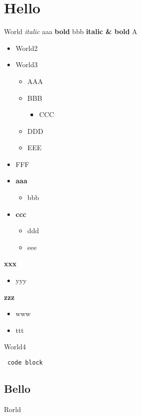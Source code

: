 ﻿\documentclass[11pt, oneside, a4paper]{book}
\begin{document}
\chapter{Hello}
World \emph{italic} aaa \textbf{bold} bbb \textbf{italic & bold} A

\begin{itemize}
\item World2
\item World3\begin{itemize}
\item AAA
\item BBB\begin{itemize}
\item CCC
\end{itemize}


\item DDD
\item EEE
\end{itemize}


\item FFF
\item \textbf{aaa}\begin{itemize}
\item bbb
\end{itemize}


\item \textbf{ccc}\begin{itemize}
\item ddd
\item eee
\end{itemize}


\end{itemize}

\textbf{xxx}

\begin{itemize}
\item yyy
\end{itemize}

\textbf{zzz}

\begin{itemize}
\item www
\item ttt
\end{itemize}

World4


\begin{verbatim}
 code block\end{verbatim}


\section{Bello}
Rorld
\end{document}
